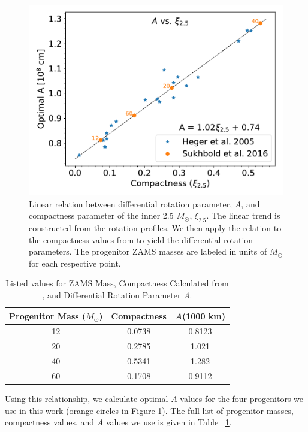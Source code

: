 \documentclass[twocolumn,times]{aastex62}  %
\begin{document}
\begin{figure}[t]
    \centering
    \includegraphics[scale=0.45]{a_vs_compact.pdf}
    \caption{Linear relation between differential rotation parameter, $A$, and compactness parameter of the inner 2.5 $M_\odot$, $\xi_{2.5}$.  The linear trend is constructed from the \citet{heger:2005} rotation profiles.  We then apply the relation to the compactness values from \citet{Suk:2016} to yield the differential rotation parameters.  The progenitor ZAMS masses are labeled in units of $M_\odot$ for each respective point.}
    \label{fig:a_vs_comp}
\end{figure}

\begin{table}[t]
\begin{tabular}{c|c|c}
Progenitor Mass ($M_\odot$) & Compactness & \textit{A}(1000 km) \\
\hline
12  & 0.0738 &         0.8123             \\
20  & 0.2785 &         1.021            \\
40  & 0.5341 &         1.282           \\
60  & 0.1708 &         0.9112          
\end{tabular}
\caption{Listed values for ZAMS Mass, Compactness Calculated from \citet{Suk:2016}, and Differential Rotation Parameter \textit{A}.}
\label{table:compact}
\end{table}

Using this relationship, we calculate optimal $A$ values for the four \citet{Suk:2016} progenitors we use in this work (orange circles in Figure \ref{fig:a_vs_comp}).  
The full list of progenitor masses, compactness values, and \textit{A} values we use is given in Table ~\ref{table:compact}.  
\end{document}
